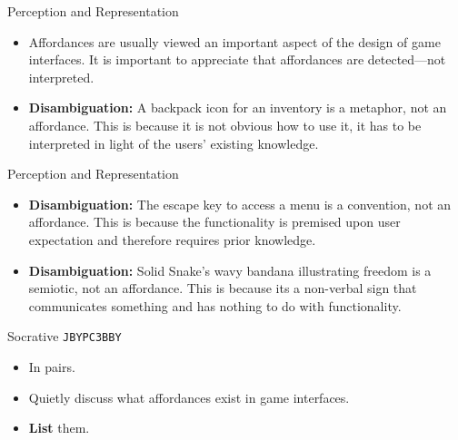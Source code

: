\begin{frame}{Perception and Representation}
	\begin{itemize}
		\item Affordances are usually viewed an important aspect of the design of game interfaces. It is important to appreciate that affordances are detected---not interpreted.
		\item \textbf{Disambiguation:} A backpack icon for an inventory is a metaphor, not an affordance. This is because it is not obvious how to use it, it has to be interpreted in 
		light of the users' existing knowledge.
	\end{itemize}
\end{frame}

\begin{frame}{Perception and Representation}
	\begin{itemize}
		\item \textbf{Disambiguation:} The escape key to access a menu is a convention, not an affordance. This is because the functionality is premised upon user expectation 
		and therefore requires prior knowledge.
		\item \textbf{Disambiguation:} Solid Snake's wavy bandana illustrating freedom is a semiotic, not an affordance. This is because its a non-verbal sign that communicates 				something and has nothing to do with functionality.
	\end{itemize}
\end{frame}

\begin{frame}[fragile]{Socrative \texttt{JBYPC3BBY}}
	\begin{itemize}
		\item In pairs.
		\item Quietly discuss what affordances exist in game interfaces.
		\item \textbf{List} them.
	\end{itemize}
\end{frame}

